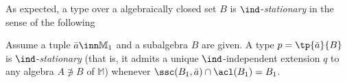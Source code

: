 As expected, a type over a algebraically closed set $B$ is $\ind$-{\em stationary}
in the sense of the following 
\begin{cor}\label{stationary}
Assume a tuple $\bar a\inn \mathbb{M}_{1}$ and a subalgebra $B$ are given.
A type $p=\tp{\bar a}{B}$ is $\ind$-{\em stationary} {\rm(that is, it admits
a unique $\ind$-independent extension $q$ to any algebra $A\nni B$ of $\mathbb{M}$)} %
whenever $\ssc(B_{1},\bar a)\cap\acl(B_{1})=B_{1}$.
\end{cor}

